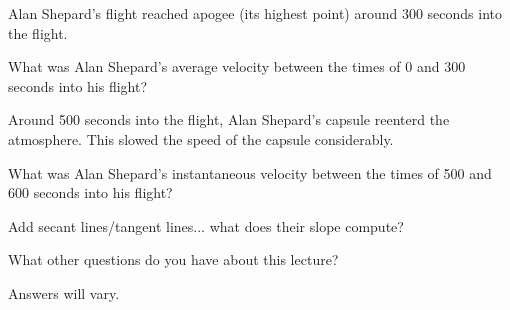 \documentclass{ximera}
\begin{document}
Alan Shepard's flight reached apogee (its highest point) around 300
seconds into the flight.

\begin{question}
  What was Alan Shepard's average velocity between the times of 0 and
  300 seconds into his flight?
  \begin{solution}
    \begin{multiple-choice}
    \end{multiple-choice}  
  \end{solution}
\end{question}

Around 500 seconds into the flight, Alan Shepard's capsule reenterd
the atmosphere. This slowed the speed of the capsule considerably.

\begin{question}
  What was Alan Shepard's instantaneous velocity between the times of
  500 and 600 seconds into his flight?
  \begin{solution}
    \begin{multiple-choice}
    \end{multiple-choice}  
  \end{solution}
\end{question}

\begin{question}
Add secant lines/tangent lines... what does their slope compute?
\end{question}



What other questions do you have about this lecture?
\begin{free-response}
Answers will vary.
\end{free-response}
\end{document}
